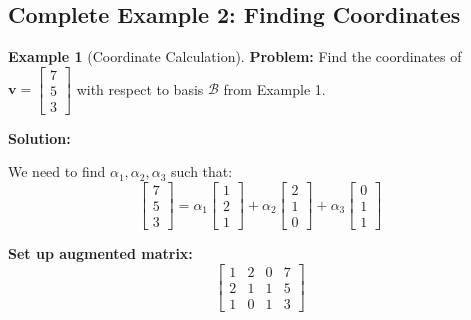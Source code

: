 \documentclass[12pt,a4paper]{article}
\theoremstyle{definition}
\newtheorem{example}{Example}[section]
\begin{document}
\subsection{Complete Example 2: Finding Coordinates}

\begin{example}[Coordinate Calculation]
\textbf{Problem:} Find the coordinates of $\mathbf{v} = \begin{bmatrix} 7 \\ 5 \\ 3 \end{bmatrix}$ with respect to basis $\mathcal{B}$ from Example 1.

\textbf{Solution:}

We need to find $\alpha_1, \alpha_2, \alpha_3$ such that:
\begin{equation}
\begin{bmatrix} 7 \\ 5 \\ 3 \end{bmatrix} = \alpha_1\begin{bmatrix} 1 \\ 2 \\ 1 \end{bmatrix} + \alpha_2\begin{bmatrix} 2 \\ 1 \\ 0 \end{bmatrix} + \alpha_3\begin{bmatrix} 0 \\ 1 \\ 1 \end{bmatrix}
\end{equation}

\textbf{Set up augmented matrix:}
\begin{equation}
\left[\begin{array}{ccc|c} 1 & 2 & 0 & 7 \\ 2 & 1 & 1 & 5 \\ 1 & 0 & 1 & 3 \end{array}\right]
\end{equation}


\end{example}
\end{document}
